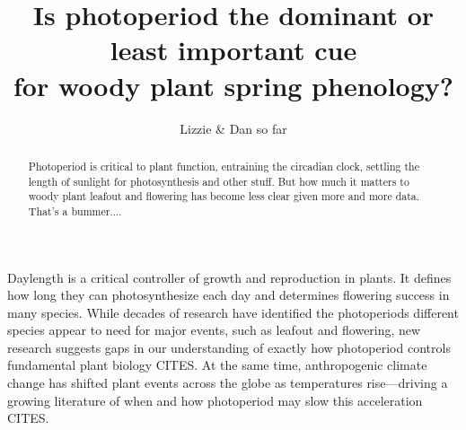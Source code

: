 \documentclass[11pt]{article}
\begin{document}
\renewcommand{\refname}{\CHead{}}

\title{Is photoperiod the dominant or least important cue \\for woody plant spring phenology?} %
\author{Lizzie \& Dan so far}
\maketitle

\begin{abstract}
Photoperiod is critical to plant function, entraining the circadian clock, settling the length of sunlight for photosynthesis and other stuff. But how much it matters to woody plant leafout and flowering has become less clear given more and more data. That's a bummer....
\end{abstract}


Daylength is a critical controller of growth and reproduction in plants. It defines how long they can photosynthesize each day and determines flowering success in many species. While decades of research have identified the photoperiods different species appear to need for major events, such as leafout and flowering, new research suggests gaps in our understanding of exactly how photoperiod controls fundamental plant biology CITES. At the same time, anthropogenic climate change has shifted plant events across the globe as temperatures rise---driving a growing literature of when and how photoperiod may slow this acceleration CITES. 
\end{document}
